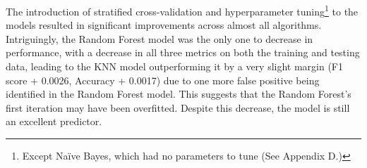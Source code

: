 \documentclass[12pt]{report}
\begin{document}
The introduction of stratified cross-validation and hyperparameter tuning\footnote{Except Na\"ive Bayes, which had no parameters to tune (See Appendix D.)} to the models
resulted in significant improvements across almost all algorithms. Intriguingly, the Random Forest model was the only one to decrease in performance, with a decrease in 
all three metrics on both the training and testing data, leading to the KNN model outperforming it by a very slight margin (F1 score + 0.0026, Accuracy + 0.0017)
due to one more false positive being identified in the Random Forest model. This suggests that the Random Forest's first iteration may have been overfitted. Despite 
this decrease, the model is still an excellent predictor.
\end{document}
